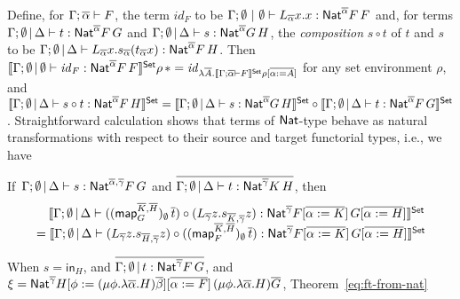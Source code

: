 \documentclass{lmcs}
\theoremstyle{plain}\newtheorem{satz}[thm]{Satz}
\renewcommand{\id}{\mathit{id}}
\newcommand{\map}{\mathsf{map}}
\begin{document}
Define, for $\Gamma; \overline{\alpha} \vdash F$, the term $\id_F$ to be
$\Gamma;\emptyset~|~\emptyset \vdash L_{\overline{\alpha}}x.x :
\mathsf{Nat}^{\overline{\alpha}} F\,F$ and, for terms $\Gamma; \emptyset \,|\,
\Delta \vdash t: \mathsf{Nat}^{\overline{\alpha}} F\,G$ and $\Gamma; \emptyset
\,|\, \Delta \vdash s: \mathsf{Nat}^{\overline{\alpha}} G\,H$, the {\em
  composition} $s \circ t$ of $t$ and $s$ to be $\Gamma;
\emptyset\,|\, \Delta \vdash L_{\overline{\alpha}}
x. s_{\overline{\alpha}}(t_{\overline{\alpha}}x):
\mathsf{Nat}^{\overline{\alpha}} F\,H$. Then $\setsem{\Gamma; \emptyset \,|\,
  \emptyset \vdash \id_{F} : \Nat^{\ol{\alpha}} F\,F} \rho\, \ast =
\id_{\lambda \ol{A}. \setsem{\Gamma; \ol{\alpha} \vdash F} \rho
  [\ol{\alpha := A}]}$ for any set environment $\rho$, and
$\llbracket{\Gamma; \emptyset \,|\, \Delta \vdash s \circ t:
  \mathsf{Nat}^{\overline{\alpha}} F\,H}\rrbracket^{\mathsf{Set}} = \llbracket{\Gamma; \emptyset \,|\,
  \Delta \vdash s: \mathsf{Nat}^{\overline{\alpha}} G\,H}\rrbracket^{\mathsf{Set}} \circ
\llbracket{\Gamma; \emptyset \,|\, \Delta \vdash t:
  \mathsf{Nat}^{\overline{\alpha}} F\,G}\rrbracket^{\mathsf{Set}}$. Straightforward calculation shows
that terms of $\mathsf{Nat}$-type behave as natural transformations with
respect to their source and target functorial types, i.e., we have
\begin{thm}\label{eq:ft-from-nat} 
  If\, $\Gamma; \emptyset \,|\, \Delta \vdash s : \mathsf{Nat}^{\overline{\alpha},
  \overline{\gamma}} F\,G$ and $\overline{\Gamma; \emptyset \,|\,
  \Delta \vdash t : \mathsf{Nat}^{\overline{\gamma}} K\, H}$, then
  \[\begin{array}{l}
  \hspace*{0.135in}
\setsem{\Gamma; \emptyset\,|\, \Delta
  \vdash 
  ((\map_G^{\overline{K}, \overline{H}})_\emptyset \,\overline{t}) \circ
(L_{\overline{\gamma}} z. s_{\overline{K}, \overline{\gamma}}
  z)
  : \Nat^{\overline{\gamma}} F[\overline{\alpha := K}]\,
  G[\overline{\alpha := H}]}\\
= \setsem{ \Gamma; \emptyset \,|\, \Delta \vdash
(L_{\overline{\gamma}} z.
  s_{\overline{H}, \overline{\gamma}} z)\circ
  ((\map_F^{\overline{K}, \overline{H}})_\emptyset \,
  \overline{t})  : \Nat^{\overline{\gamma}} F[\overline{\alpha :=
      K}]\, G[\overline{\alpha := H}]}
\end{array}\]
\end{thm}
\noindent
When $s = \mathsf{in}_H$, and
$\overline{\Gamma; \emptyset \,|\, t :
 \mathsf{Nat}^{\overline{\gamma}} F\, G}$,
and $\xi = \mathsf{Nat}^{\overline{\gamma}} H[\phi :=
  (\mu \phi. \lambda \overline{\alpha}. H)
  \overline{\beta}][\overline{\alpha := F}]\, (\mu \phi. \lambda
\overline{\alpha}. H)\overline{G}$, Theorem~\ref{eq:ft-from-nat}
\end{document}
